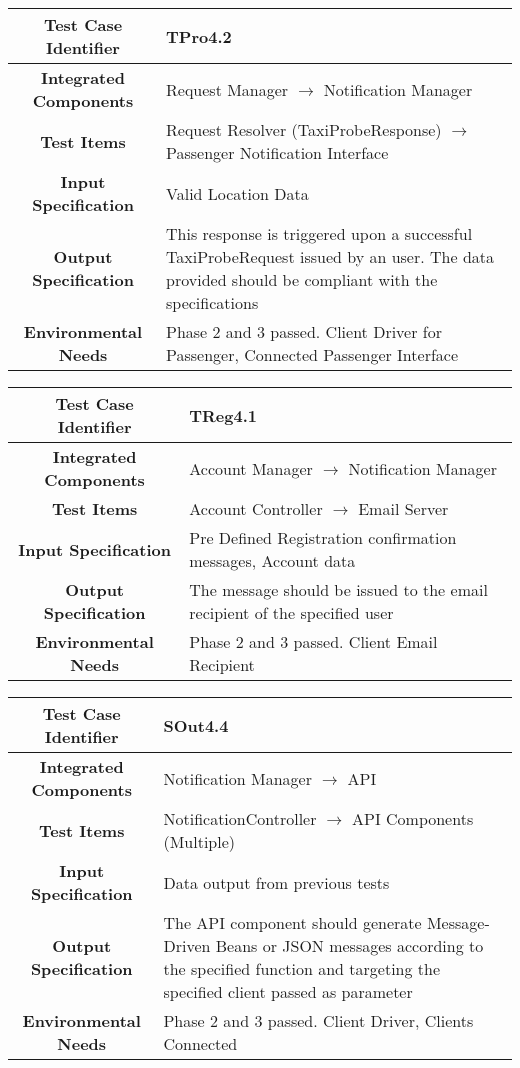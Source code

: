 \documentclass[11pt, a4paper,titlepage]{article}
\begin{document}
			\begin{tabularx}{\textwidth}{| c|X|}
				\hline \textbf{Test Case Identifier} & \label{TPro4.2}TPro4.2 \\
				\hline \textbf{Integrated Components} &  Request Manager $\rightarrow $ Notification Manager \\
				\hline \textbf{Test Items} & Request Resolver (TaxiProbeResponse) $\rightarrow $ Passenger Notification Interface \\
				\hline \textbf{Input Specification} & Valid Location Data \\
				\hline \textbf{Output Specification} & This response is triggered upon a successful TaxiProbeRequest issued by an user. \newline
				The data provided should be compliant with the specifications \\
				\hline \textbf{Environmental Needs} & Phase 2 and 3 passed. Client Driver for Passenger, Connected Passenger Interface \\
				\hline
			\end{tabularx}
			\newline
			
			\begin{tabularx}{\textwidth}{| c|X|}
				\hline \textbf{Test Case Identifier} & \label{TReg4.1}TReg4.1 \\
				\hline \textbf{Integrated Components} & Account Manager $\rightarrow $ Notification Manager \\
				\hline \textbf{Test Items} & Account Controller $\rightarrow $ Email Server \\
				\hline \textbf{Input Specification} & Pre Defined Registration confirmation messages, Account data \\
				\hline \textbf{Output Specification} & The message should be issued to the email recipient of the specified user \\
				\hline \textbf{Environmental Needs} & Phase 2 and 3 passed. Client Email Recipient \\
				\hline
			\end{tabularx}
			\newline
			
			\begin{tabularx}{\textwidth}{| c|X|}
				\hline \textbf{Test Case Identifier} & \label{SOut4.4 }SOut4.4 \\
				\hline \textbf{Integrated Components} & Notification Manager $\rightarrow $ API \\
				\hline \textbf{Test Items} & NotificationController $\rightarrow $ API Components (Multiple) \\
				\hline \textbf{Input Specification} & Data output from previous tests \\
				\hline \textbf{Output Specification} & The API component should generate Message-Driven Beans or JSON messages according to the specified function and targeting the specified client passed as parameter \\
				\hline \textbf{Environmental Needs} & Phase 2 and 3 passed. Client Driver, Clients Connected \\
				\hline
			\end{tabularx}
			\newline
			
\end{document}
